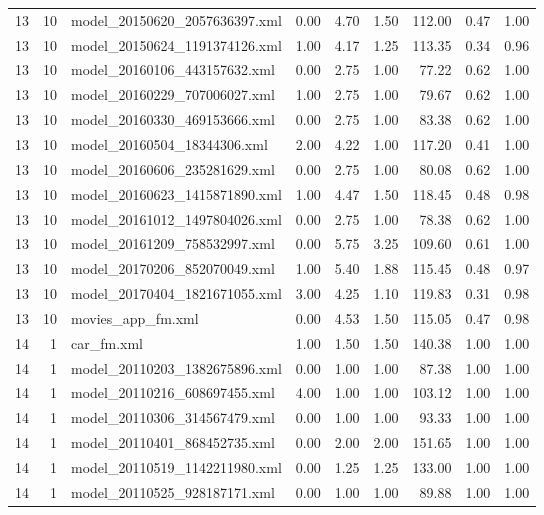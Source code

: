 \begin{table}[ht]
\begin{tabular}{rrlrrrrrr}
   13 &  10 & model\_20150620\_2057636397.xml & 0.00 & 4.70 & 1.50 & 112.00 & 0.47 & 1.00 \\ 
   13 &  10 & model\_20150624\_1191374126.xml & 1.00 & 4.17 & 1.25 & 113.35 & 0.34 & 0.96 \\ 
   13 &  10 & model\_20160106\_443157632.xml & 0.00 & 2.75 & 1.00 & 77.22 & 0.62 & 1.00 \\ 
   13 &  10 & model\_20160229\_707006027.xml & 1.00 & 2.75 & 1.00 & 79.67 & 0.62 & 1.00 \\ 
   13 &  10 & model\_20160330\_469153666.xml & 0.00 & 2.75 & 1.00 & 83.38 & 0.62 & 1.00 \\ 
   13 &  10 & model\_20160504\_18344306.xml & 2.00 & 4.22 & 1.00 & 117.20 & 0.41 & 1.00 \\ 
   13 &  10 & model\_20160606\_235281629.xml & 0.00 & 2.75 & 1.00 & 80.08 & 0.62 & 1.00 \\ 
   13 &  10 & model\_20160623\_1415871890.xml & 1.00 & 4.47 & 1.50 & 118.45 & 0.48 & 0.98 \\ 
   13 &  10 & model\_20161012\_1497804026.xml & 0.00 & 2.75 & 1.00 & 78.38 & 0.62 & 1.00 \\ 
   13 &  10 & model\_20161209\_758532997.xml & 0.00 & 5.75 & 3.25 & 109.60 & 0.61 & 1.00 \\ 
   13 &  10 & model\_20170206\_852070049.xml & 1.00 & 5.40 & 1.88 & 115.45 & 0.48 & 0.97 \\ 
   13 &  10 & model\_20170404\_1821671055.xml & 3.00 & 4.25 & 1.10 & 119.83 & 0.31 & 0.98 \\ 
   13 &  10 & movies\_app\_fm.xml & 0.00 & 4.53 & 1.50 & 115.05 & 0.47 & 0.98 \\ 
   14 &   1 & car\_fm.xml & 1.00 & 1.50 & 1.50 & 140.38 & 1.00 & 1.00 \\ 
   14 &   1 & model\_20110203\_1382675896.xml & 0.00 & 1.00 & 1.00 & 87.38 & 1.00 & 1.00 \\ 
   14 &   1 & model\_20110216\_608697455.xml & 4.00 & 1.00 & 1.00 & 103.12 & 1.00 & 1.00 \\ 
   14 &   1 & model\_20110306\_314567479.xml & 0.00 & 1.00 & 1.00 & 93.33 & 1.00 & 1.00 \\ 
   14 &   1 & model\_20110401\_868452735.xml & 0.00 & 2.00 & 2.00 & 151.65 & 1.00 & 1.00 \\ 
   14 &   1 & model\_20110519\_1142211980.xml & 0.00 & 1.25 & 1.25 & 133.00 & 1.00 & 1.00 \\ 
   14 &   1 & model\_20110525\_928187171.xml & 0.00 & 1.00 & 1.00 & 89.88 & 1.00 & 1.00 \\ 

\end{tabular}
\end{table}
